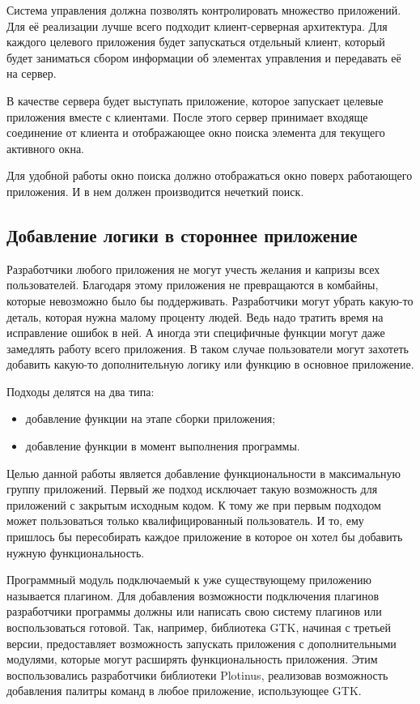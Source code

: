 Система управления должна позволять контролировать множество приложений. Для её
реализации лучше всего подходит клиент-серверная архитектура. Для каждого
целевого приложения будет запускаться отдельный клиент, который будет заниматься
сбором информации об элементах управления и передавать её на сервер.

В качестве сервера будет выступать приложение, которое запускает целевые
приложения вместе с клиентами. После этого сервер принимает входяще соединение
от клиента и отображающее окно поиска элемента для текущего активного окна.

Для удобной работы окно поиска должно отображаться окно поверх работающего
приложения. И в нем должен производится нечеткий поиск.

\subsection{Добавление логики в стороннее приложение}

Разработчики любого приложения не могут учесть желания и капризы всех
пользователей. Благодаря этому приложения не превращаются в комбайны, которые
невозможно было бы поддерживать. Разработчики могут убрать какую-то деталь,
которая нужна малому проценту людей. Ведь надо тратить время на исправление
ошибок в ней. А иногда эти специфичные функции могут даже замедлять работу всего
приложения. В таком случае пользователи могут захотеть добавить какую-то
дополнительную логику или функцию в основное приложение.

Подходы делятся на два типа:
\begin{itemize}
	\item добавление функции на этапе сборки приложения;
	\item добавление функции в момент выполнения программы.
\end{itemize}

Целью данной работы является добавление функциональности в максимальную группу
приложений. Первый же подход исключает такую возможность для приложений с
закрытым исходным кодом. К тому же при первым подходом может пользоваться только
квалифицированный пользователь. И то, ему пришлось бы пересобирать каждое
приложение в которое он хотел бы добавить нужную функциональность.

Программный модуль подключаемый к уже существующему приложению называется
плагином. Для добавления возможности подключения плагинов разработчики программы
должны или написать свою систему плагинов или воспользоваться готовой. Так,
например, библиотека GTK, начиная с третьей версии, предоставляет возможность
запускать приложения с дополнительными модулями, которые могут расширять
функциональность приложения. Этим воспользовались разработчики библиотеки
Plotinus, реализовав возможность добавления палитры команд в любое приложение,
использующее GTK.

